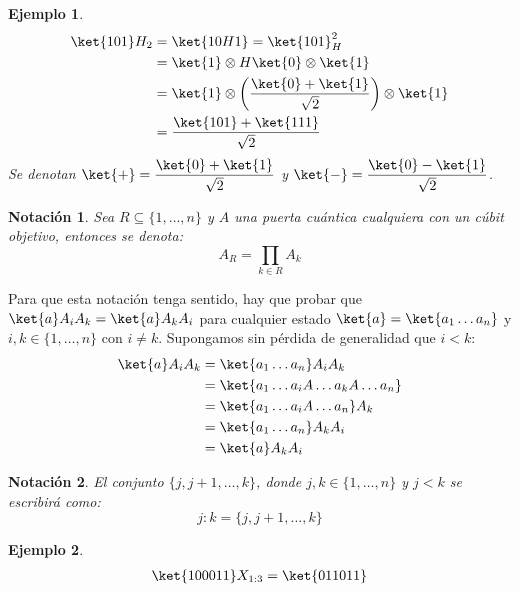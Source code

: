 \documentclass[10pt,conference,a4paper]{IEEEtran}
\newtheorem{notacion}{Notación}[subsection]
\newtheorem{ejemplo}{Ejemplo}
\begin{document}
    \begin{ejemplo}
        \begin{align*}
            \ket{101}H_2&=\ket{10H1}=\ket{101}_H^2\\
            &=\ket{1}\otimes H\ket{0}\otimes\ket{1}\\
            &=\ket{1}\otimes\left(\dfrac{\ket{0}+\ket{1}}{\sqrt{2}}\right)\otimes\ket{1}\\
            &=\dfrac{\ket{101}+\ket{111}}{\sqrt{2}}
        \end{align*}
        Se denotan $\ket{+}=\dfrac{\ket{0}+\ket{1}}{\sqrt{2}}$ y $\ket{-}=\dfrac{\ket{0}-\ket{1}}{\sqrt{2}}$.
    \end{ejemplo}
    \vspace{3mm}
    \begin{notacion}
        Sea $R\subseteq \{1,\ldots,n\}$ y $A$ una puerta cuántica cualquiera con un cúbit objetivo, entonces se denota:
        \begin{equation}
            A_R=\displaystyle\prod_{k\in R}A_k
            \label{not:5}
        \end{equation}
    \end{notacion}
    Para que esta notación tenga sentido, hay que probar que $\ket{a}A_iA_k=\ket{a}A_kA_i$ para cualquier estado $\ket{a}=\ket{a_1\ldots a_n}$ y $i,k\in\{1,\ldots,n\}$ con $i\neq k$. Supongamos sin pérdida de generalidad que $i<k$:\\
    \begin{align*}
        \ket{a}A_iA_k&=\ket{a_1\ldots a_n}A_iA_k\\
        &=\ket{a_1\ldots a_iA\ldots a_kA \ldots a_n}\\
        &=\ket{a_1\ldots a_iA \ldots a_n}A_k\\
        &=\ket{a_1\ldots a_n}A_k A_i\\
        &=\ket{a}A_kA_i
    \end{align*}
    \vspace{1.5mm}
    \begin{notacion}
        El conjunto $\{j,j+1,\ldots,k\}$, donde $j,k\in\{1,\ldots,n\}$ y $j<k$ se escribirá como:
        \begin{equation}
            j:k= \{j,j+1,\ldots,k\}
            \label{not:6}
        \end{equation}
    \end{notacion}

    \begin{ejemplo}
        \begin{align*}
            \ket{100011}X_{1:3}=\ket{011011}
        \end{align*}
    \end{ejemplo}
    \vspace{0.15cm}
\end{document}

